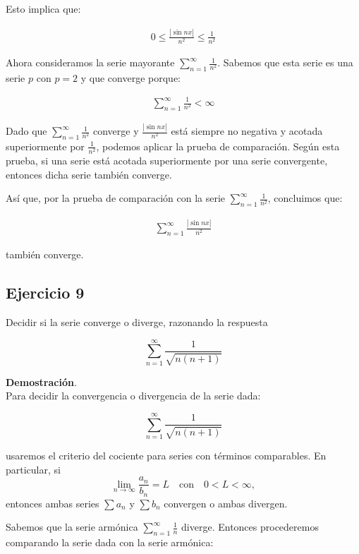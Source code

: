 \documentclass{article}
\begin{document}
    Esto implica que:

    \begin{align*}
    0 \leq \frac{|\sin n x|}{n^{2}} \leq \frac{1}{n^{2}}
    \end{align*}

    Ahora consideramos la serie mayorante $\sum_{n=1}^{\infty} \frac{1}{n^{2}}$. Sabemos que esta serie es una serie $p$ con $p = 2$ y que converge porque:

    \begin{align*}
    \sum_{n=1}^{\infty} \frac{1}{n^{2}} < \infty
    \end{align*}

    Dado que $\sum_{n=1}^{\infty} \frac{1}{n^{2}}$ converge y $\frac{|\sin n x|}{n^{2}}$ está siempre no negativa y acotada superiormente por $\frac{1}{n^{2}}$, podemos aplicar la prueba de comparación. Según esta prueba, si una serie está acotada superiormente por una serie convergente, entonces dicha serie también converge.

    Así que, por la prueba de comparación con la serie $\sum_{n=1}^{\infty} \frac{1}{n^{2}}$, concluimos que:

    \begin{align*}
    \sum_{n=1}^{\infty} \frac{|\sin n x|}{n^{2}}
    \end{align*}

    también converge.

    \subsection*{Ejercicio 9}

    Decidir si la serie converge o diverge, razonando la respuesta

    $$
    \sum_{n=1}^{\infty} \frac{1}{\sqrt{n(n+1)}}
    $$

    \textbf{Demostración}.\\

    Para decidir la convergencia o divergencia de la serie dada:

    $$
    \sum_{n=1}^{\infty} \frac{1}{\sqrt{n(n+1)}}
    $$

    usaremos el criterio del cociente para series con términos comparables. En particular, si
    \[
    \lim _{n \rightarrow \infty} \frac{a_{n}}{b_{n}}=L \quad \text{con} \quad 0 < L < \infty,
    \]
    entonces ambas series \(\sum a_n\) y \(\sum b_n\) convergen o ambas divergen.

    Sabemos que la serie armónica \(\sum_{n=1}^{\infty} \frac{1}{n}\) diverge. Entonces procederemos comparando la serie dada con la serie armónica:
\end{document}
